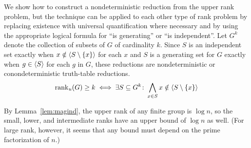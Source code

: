We show how to construct a nondeterministic reduction from the upper rank problem, but the technique can be applied to each other type of rank problem by replacing existence with universal quantification where necessary and by using the appropriate logical formula for ``is generating'' or ``is independent''.
Let $G^k$ denote the collection of subsets of $G$ of cardinality $k$.
Since $S$ is an independent set exactly when $x \notin \langle S \setminus \{x\} \rangle$ for each $x$ and $S$ is a generating set for $G$ exactly when $g \in \langle S \rangle$ for each $g$ in $G$, these reductions are nondeterministic or conondeterministic truth-table reductions.
$$
  \operatorname{rank}_u(G) \geq k \iff \exists S \subseteq G^k\colon \bigwedge_{x \in S} x \notin \langle S \setminus \{x\} \rangle
$$

By Lemma~\ref{lem:magind}, the upper rank of any finite group is $\log n$, so the small, lower, and intermediate ranks have an upper bound of $\log n$ as well.
(For large rank, however, it seems that any bound must depend on the prime factorization of $n$.)

